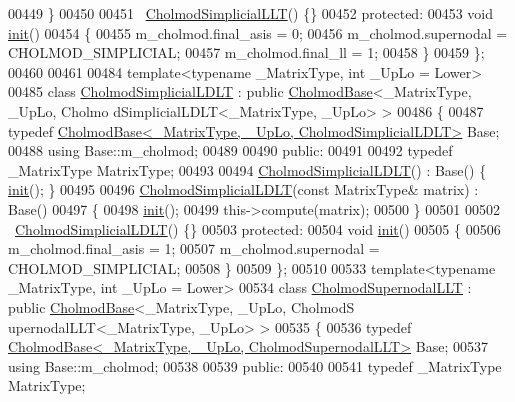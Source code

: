 \begin{DoxyCode}
00449     \}
00450 
00451     ~\hyperlink{class_eigen_1_1_cholmod_simplicial_l_l_t}{CholmodSimplicialLLT}() \{\}
00452   \textcolor{keyword}{protected}:
00453     \textcolor{keywordtype}{void} \hyperlink{structinit}{init}()
00454     \{
00455       m\_cholmod.final\_asis = 0;
00456       m\_cholmod.supernodal = CHOLMOD\_SIMPLICIAL;
00457       m\_cholmod.final\_ll = 1;
00458     \}
00459 \};
00460 
00461 
00484 \textcolor{keyword}{template}<\textcolor{keyword}{typename} \_MatrixType, \textcolor{keywordtype}{int} \_UpLo = Lower>
00485 \textcolor{keyword}{class }\hyperlink{class_eigen_1_1_cholmod_simplicial_l_d_l_t}{CholmodSimplicialLDLT} : \textcolor{keyword}{public} \hyperlink{class_eigen_1_1_cholmod_base}{CholmodBase}<\_MatrixType, \_UpLo, Cholmo
      dSimplicialLDLT<\_MatrixType, \_UpLo> >
00486 \{
00487     \textcolor{keyword}{typedef} \hyperlink{class_eigen_1_1_cholmod_base}{CholmodBase<\_MatrixType, \_UpLo, CholmodSimplicialLDLT>}
       Base;
00488     \textcolor{keyword}{using} Base::m\_cholmod;
00489     
00490   \textcolor{keyword}{public}:
00491     
00492     \textcolor{keyword}{typedef} \_MatrixType MatrixType;
00493     
00494     \hyperlink{class_eigen_1_1_cholmod_simplicial_l_d_l_t}{CholmodSimplicialLDLT}() : Base() \{ \hyperlink{structinit}{init}(); \}
00495 
00496     \hyperlink{class_eigen_1_1_cholmod_simplicial_l_d_l_t}{CholmodSimplicialLDLT}(\textcolor{keyword}{const} MatrixType& matrix) : Base()
00497     \{
00498       \hyperlink{structinit}{init}();
00499       this->compute(matrix);
00500     \}
00501 
00502     ~\hyperlink{class_eigen_1_1_cholmod_simplicial_l_d_l_t}{CholmodSimplicialLDLT}() \{\}
00503   \textcolor{keyword}{protected}:
00504     \textcolor{keywordtype}{void} \hyperlink{structinit}{init}()
00505     \{
00506       m\_cholmod.final\_asis = 1;
00507       m\_cholmod.supernodal = CHOLMOD\_SIMPLICIAL;
00508     \}
00509 \};
00510 
00533 \textcolor{keyword}{template}<\textcolor{keyword}{typename} \_MatrixType, \textcolor{keywordtype}{int} \_UpLo = Lower>
00534 \textcolor{keyword}{class }\hyperlink{class_eigen_1_1_cholmod_supernodal_l_l_t}{CholmodSupernodalLLT} : \textcolor{keyword}{public} \hyperlink{class_eigen_1_1_cholmod_base}{CholmodBase}<\_MatrixType, \_UpLo, CholmodS
      upernodalLLT<\_MatrixType, \_UpLo> >
00535 \{
00536     \textcolor{keyword}{typedef} \hyperlink{class_eigen_1_1_cholmod_base}{CholmodBase<\_MatrixType, \_UpLo, CholmodSupernodalLLT>}
       Base;
00537     \textcolor{keyword}{using} Base::m\_cholmod;
00538     
00539   \textcolor{keyword}{public}:
00540     
00541     \textcolor{keyword}{typedef} \_MatrixType MatrixType;

\end{DoxyCode}
